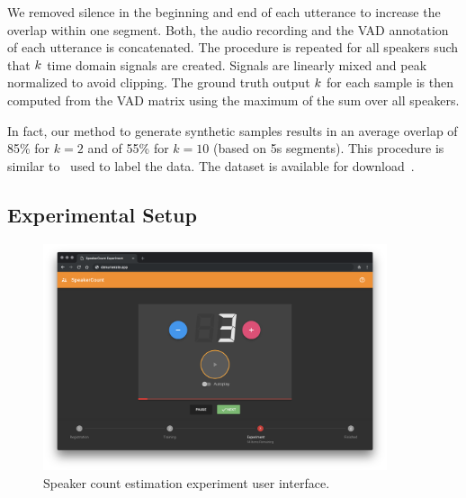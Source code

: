 We removed silence in the beginning and end of each utterance to increase the overlap within one segment.
Both, the audio recording and the VAD annotation of each utterance is concatenated.
The procedure is repeated for all speakers such that \(k \) time domain signals are created.
Signals are linearly mixed and peak normalized to avoid clipping.
The ground truth output \(k \) for each sample is then computed from the VAD matrix using the maximum of the sum over all speakers.
\par
In fact, our method to generate synthetic samples results in an average overlap of 85\% for \(k=2\) and of 55\% for \(k=10\) (based on 5s segments).
This procedure is similar to~\cite{mesaros17} used to label the data.
The dataset is available for download~\cite{oss_libricount}.

\subsection{Experimental Setup}

\begin{figure}[htb]
    \centering
        \includegraphics[width=0.9\textwidth]{Chapters/07_Analysis_Experiment/figures/experiment_ui.png}
    \caption{Speaker count estimation experiment user interface.}
    \label{fig:user_interface_speaker}
\end{figure}

